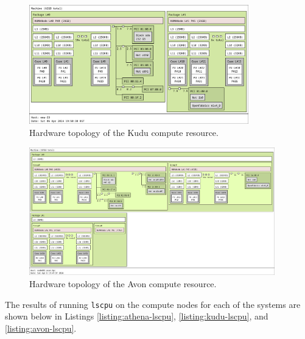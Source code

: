 \begin{figure}[H]
    \centering
    \includegraphics[width=0.85\textwidth]{images/8_appendix/kudu-topology.png}
    \caption{Hardware topology of the Kudu compute resource.}
    \label{fig:kudu-topology}
\end{figure}

\begin{figure}[H]
    \centering
    \includegraphics[width=0.95\textwidth]{images/8_appendix/avon-topology.png}
    \caption{Hardware topology of the Avon compute resource.}
    \label{fig:avon-topology}
\end{figure}

The results of running \texttt{lscpu} on the compute nodes for each of the systems are shown below in Listings \ref{listing:athena-lscpu}, \ref{listing:kudu-lscpu}, and \ref{listing:avon-lscpu}.

